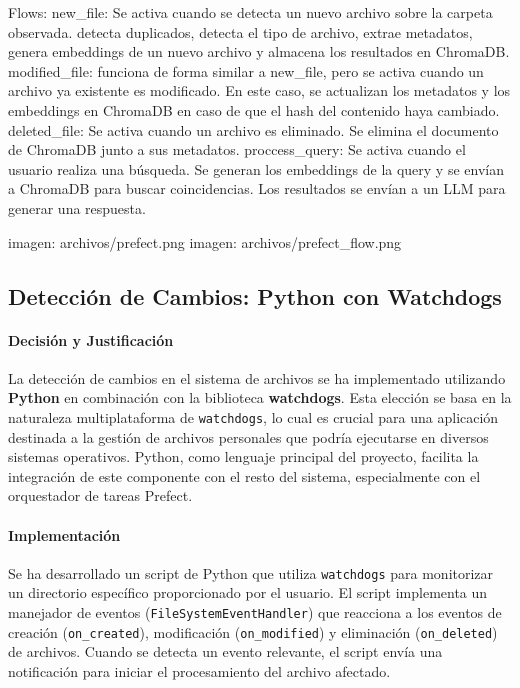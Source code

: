 Flows:
new_file: Se activa cuando se detecta un nuevo archivo sobre la carpeta observada. detecta duplicados, detecta el tipo de archivo, extrae metadatos, genera embeddings de un nuevo archivo y almacena los resultados en ChromaDB.
modified_file: funciona de forma similar a new_file, pero se activa cuando un archivo ya existente es modificado. En este caso, se actualizan los metadatos y los embeddings en ChromaDB en caso de que el hash del contenido haya cambiado.
deleted_file: Se activa cuando un archivo es eliminado. Se elimina el documento de ChromaDB junto a sus metadatos.
proccess_query: Se activa cuando el usuario realiza una búsqueda. Se generan los embeddings de la query y se envían a ChromaDB para buscar coincidencias. Los resultados se envían a un LLM para generar una respuesta.

imagen: archivos/prefect.png
imagen: archivos/prefect_flow.png

\subsection{Detección de Cambios: Python con Watchdogs}
\label{subsec:decision_watchdogs}
\paragraph{Decisión y Justificación}
La detección de cambios en el sistema de archivos se ha implementado utilizando \textbf{Python} en combinación con la biblioteca \textbf{watchdogs}. Esta elección se basa en la naturaleza multiplataforma de \texttt{watchdogs}, lo cual es crucial para una aplicación destinada a la gestión de archivos personales que podría ejecutarse en diversos sistemas operativos. Python, como lenguaje principal del proyecto, facilita la integración de este componente con el resto del sistema, especialmente con el orquestador de tareas Prefect.

\paragraph{Implementación}
Se ha desarrollado un script de Python que utiliza \texttt{watchdogs} para monitorizar un directorio específico proporcionado por el usuario. El script implementa un manejador de eventos (\texttt{FileSystemEventHandler}) que reacciona a los eventos de creación (\texttt{on\_created}), modificación (\texttt{on\_modified}) y eliminación (\texttt{on\_deleted}) de archivos. Cuando se detecta un evento relevante, el script envía una notificación para iniciar el procesamiento del archivo afectado.

